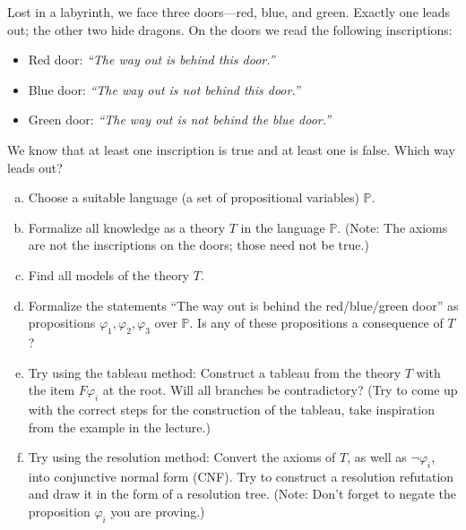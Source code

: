 \begin{problem}\label{problem:dragons}
    
    Lost in a labyrinth, we face three doors---red, blue, and green. Exactly one leads out; the other two hide dragons. On the doors we read the following inscriptions:
    \begin{itemize}
        \item Red door: {\it ``The way out is behind this door.''}
        \item Blue door: {\it ``The way out is not behind this door.''}
        \item Green door: {\it ``The way out is not behind the blue door.''}
    \end{itemize}
    We know that at least one inscription is true and at least one is false. Which way leads out?
    \begin{enumerate}[(a)]
        \item Choose a suitable language (a set of propositional variables) $\mathbb P$.
        \item Formalize all knowledge as a theory $T$ in the language $\mathbb P$. (Note: The axioms are not the inscriptions on the doors; those need not be true.)
        \item Find all models of the theory $T$.
        \item Formalize the statements ``The way out is behind the red/blue/green door'' as propositions $\varphi_1,\varphi_2,\varphi_3$ over $\mathbb P$. Is any of these propositions a consequence of $T$?
        \item Try using the tableau method: Construct a tableau from the theory $T$ with the item $F\varphi_i$ at the root. Will all branches be contradictory? (Try to come up with the correct steps for the construction of the tableau, take inspiration from the example in the lecture.)
        \item Try using the resolution method: Convert the axioms of $T$, as well as $\neg\varphi_i$, into conjunctive normal form (CNF). Try to construct a resolution refutation and draw it in the form of a resolution tree. (Note: Don’t forget to negate the proposition $\varphi_i$ you are proving.)
    \end{enumerate}  


\end{problem}
